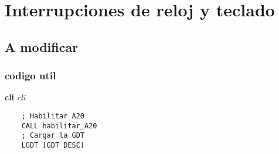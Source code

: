 
\section{Interrupciones de reloj y teclado}
\subsection{A modificar}
\subsubsection{codigo util}
\textbf{cli} \textit{cli}

\begin{codesnippet}
\begin{verbatim}
    ; Habilitar A20
    CALL habilitar_A20
    ; Cargar la GDT
    LGDT [GDT_DESC]
\end{verbatim}
\end{codesnippet}
